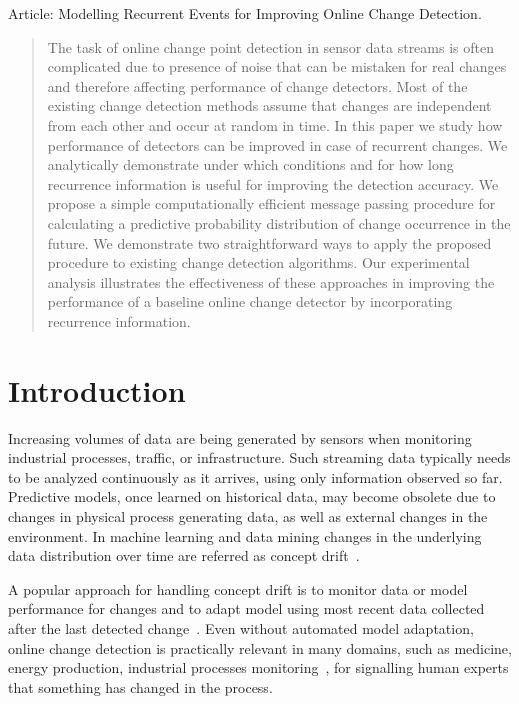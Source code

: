 Article: Modelling Recurrent Events for Improving Online Change Detection.

\begin{abstract}
The task of online change point detection in sensor data streams is often complicated due to presence of noise that can be mistaken for real changes and therefore affecting performance of change detectors.
Most of the existing change detection methods assume that changes are independent from each other and occur at random in time.
In this paper we study how performance of detectors can be improved in case of recurrent changes.
We analytically demonstrate under which conditions and for how long recurrence information is useful for improving the detection accuracy.
We propose a simple computationally efficient message passing procedure for calculating a predictive probability distribution of change occurrence in the future. We demonstrate two straightforward ways to apply the proposed procedure to existing change detection algorithms.
Our experimental analysis illustrates the effectiveness of these approaches in improving the performance of a baseline online change detector by incorporating recurrence information.
\end{abstract}

\section{Introduction}
Increasing volumes of data are being generated by sensors when monitoring industrial processes, traffic, or infrastructure.
Such streaming data typically needs to be analyzed continuously as it arrives, using only information observed so far.
Predictive models, once learned on historical data, may become obsolete due to changes in physical process generating data, as well as external changes in the environment.
In machine learning and data mining changes in the underlying data distribution over time are referred as concept drift~\cite{Widmer96}.

A popular approach for handling concept drift is to monitor data or model performance for changes and to adapt model using most recent data collected after the last detected change~\cite{GamaACMCS2014}.
Even without automated model adaptation, online change detection is practically relevant in many domains, such as medicine, energy production, industrial processes monitoring~\cite{Nikiforov}, for signalling human experts that something has changed in the process.

